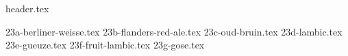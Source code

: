 \clearpage
{}
\divisorLine
{header.tex}
\begin{multicols*}{2}
{23a-berliner-weisse.tex}
{23b-flanders-red-ale.tex}
{23c-oud-bruin.tex}
{23d-lambic.tex}
{23e-gueuze.tex}
{23f-fruit-lambic.tex}
{23g-gose.tex}
\end{multicols*}